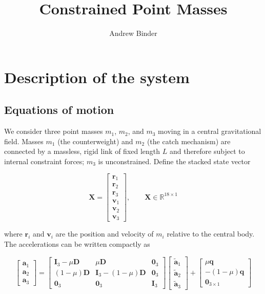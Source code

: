 \documentclass[]{article}
\title{Constrained Point Masses}
\author{Andrew Binder}
\date{}
\begin{document}
	\maketitle

	\section{Description of the system}

	\subsection{Equations of motion}

	We consider three point masses $m_1$, $m_2$, and $m_3$ moving in a central gravitational field. Masses $m_1$ (the counterweight) and $m_2$ (the catch mechanism) are connected by a massless, rigid link of fixed length $L$ and therefore subject to internal constraint forces; $m_3$ is unconstrained.  Define the stacked state vector

	\begin{equation*}
		\mathbf{X} = \begin{bmatrix}
			\mathbf{r}_1 \\ \mathbf{r}_2 \\ \mathbf{r}_3 \\ \mathbf{v}_1 \\ \mathbf{v}_2 \\ \mathbf{v}_3
		\end{bmatrix}, \quad\quad \mathbf{X} \in \mathbb{R}^{18\times 1}
	\end{equation*}

	where $\mathbf{r}_i$ and $\mathbf{v}_i$ are the position and velocity of $m_i$ relative to the central body. The accelerations can be written compactly as

	\begin{equation}
		\label{eq:constrained_eoms}
		\begin{bmatrix}
			\mathbf{a}_1 \\
			\mathbf{a}_2 \\
			\mathbf{a}_3
		\end{bmatrix} = \begin{bmatrix}
			\mathbf{I}_3 - \mu \mathbf{D} & \mu \mathbf{D} & \mathbf{0}_3 \\
			(1 - \mu) \mathbf{D} &    \mathbf{I}_3 - (1 - \mu) \mathbf{D} & \mathbf{0}_3 \\
			\mathbf{0}_3 & \mathbf{0}_3 & \mathbf{I}_3
		\end{bmatrix} \begin{bmatrix}
				\tilde{\mathbf{a}}_1 \\
				\tilde{\mathbf{a}}_2 \\
				\tilde{\mathbf{a}}_3
		\end{bmatrix} + \begin{bmatrix}
			\mu \mathbf{q} \\
			-(1 - \mu) \mathbf{q} \\
			\mathbf{0}_{3\times 1}
		\end{bmatrix}
	\end{equation}
\end{document}
